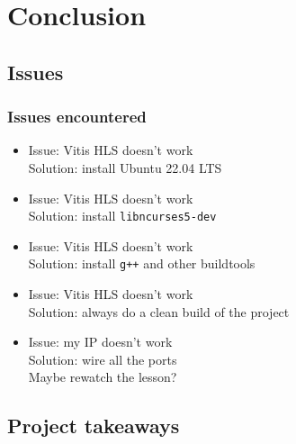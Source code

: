 \documentclass{beamer}
\begin{document}
\section{Conclusion}

\subsection{Issues}
\begin{frame}
    \frametitle{Issues encountered}

    \begin{itemize}
         \item Issue: Vitis HLS doesn't work\\Solution: install Ubuntu 22.04 LTS
         \item Issue: Vitis HLS doesn't work\\Solution: install \texttt{libncurses5-dev}
         \item Issue: Vitis HLS doesn't work\\Solution: install \texttt{g++} and other buildtools
         \item Issue: Vitis HLS doesn't work\\Solution: always do a clean build of the project
         \item Issue: my IP doesn't work\\Solution: wire all the ports\\ Maybe rewatch the lesson? 
    \end{itemize}
\end{frame}

\subsection{Project takeaways}
\begin{frame}
    \frametitle{}
\end{frame}
\end{document}
